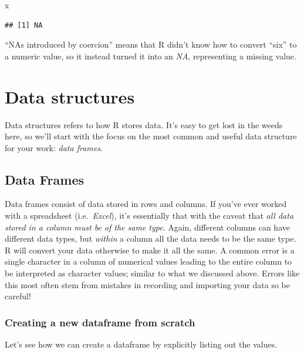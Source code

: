 \documentclass[
]{book}
\newenvironment{Shaded}{\begin{snugshade}}{\end{snugshade}}
\newcommand{\NormalTok}[1]{#1}
\begin{document}
\begin{Shaded}
\begin{Highlighting}[]
\NormalTok{x}
\end{Highlighting}
\end{Shaded}

\begin{verbatim}
## [1] NA
\end{verbatim}

``NAs introduced by coercion'' means that R didn't know how to convert ``six'' to a numeric value, so it instead turned it into an \emph{NA}, representing a missing value.

\hypertarget{data-structures}{%
\section{Data structures}\label{data-structures}}

Data structures refers to how R stores data. It's easy to get lost in the weeds here, so we'll start with the focus on the most common and useful data structure for your work: \emph{data frames}.

\hypertarget{data-frames}{%
\subsection{Data Frames}\label{data-frames}}

Data frames consist of data stored in rows and columns. If you've ever worked with a spreadsheet (i.e.~\emph{Excel}), it's essentially that with the caveat that \emph{all data stored in a column must be of the same type}. Again, different columns can have different data types, but \emph{within} a column all the data needs to be the same type. R will convert your data otherwise to make it all the same. A common error is a single character in a column of numerical values leading to the entire column to be interpreted as character values; similar to what we discussed above. Errors like this most often stem from mistakes in recording and importing your data so be careful!

\hypertarget{creating-a-new-dataframe-from-scratch}{%
\subsubsection{Creating a new dataframe from scratch}\label{creating-a-new-dataframe-from-scratch}}

Let's see how we can create a dataframe by explicitly listing out the values.
\end{document}
